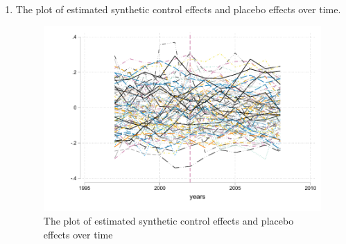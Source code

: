 \documentclass{article}
\begin{document}
\begin{enumerate}
\begin{enumerate}
       
        
        \item The plot of estimated synthetic control effects and placebo effects over time.
        \begin{figure}[ht]
        \centering
        \includegraphics[scale = 0.7]{hw8_q5c.pdf}
        \caption{The plot of estimated synthetic control effects and placebo effects over time}
        \label{fig:hw8_q5c}
        \end{figure}

        

        


        
        
    \end{enumerate}
    
\end{enumerate}
\end{document}
